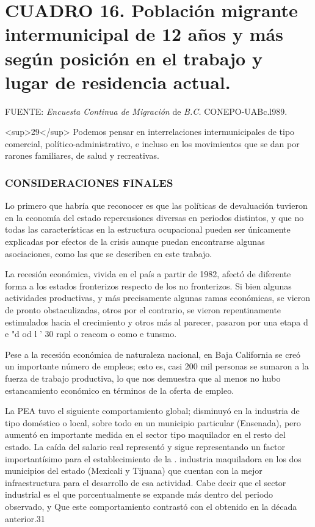 \documentclass{article}
\begin{document}
\section{CUADRO 16. Población migrante intermunicipal de 12 años y más según posición en el trabajo y lugar de residencia actual.}

FUENTE: \textit{Encuesta Continua de Migración} de \textit{B.C.} CONEPO-UABc.l989.

<sup>29</sup> Podemos pensar en interrelaciones intermunicipales de tipo comercial, político-administrativo, e incluso en los movimientos que se dan por rarones familiares, de salud y recreativas.

\subsubsection{\textbf{CONSIDERACIONES FINALES}}

Lo primero que habría que reconocer es que las políticas de devaluación tuvieron en la economía del estado repercusiones diversas en periodos distintos, y que no todas las características en la estructura ocupacional pueden ser únicamente explicadas por efectos de la crisis aunque puedan encontrarse algunas asociaciones, como las que se describen en este trabajo.

La recesión económica, vivida en el país a partir de 1982, afectó de diferente forma a los estados fronterizos respecto de los no fronterizos. Si bien algunas actividades productivas, y más precisamente algunas ramas económicas, se vieron de pronto obstaculizadas, otros por el contrario, se vieron repentinamente estimulados hacia el crecimiento y otros más al parecer, pasaron por una etapa d e "d od l ' 30 rapl o reacom o como e tunsmo.

Pese a la recesión económica de naturaleza nacional, en Baja California se creó un importante número de empleos; esto es, casi 200 mil personas se sumaron a la fuerza de trabajo productiva, lo que nos demuestra que al menos no hubo estancamiento económico en términos de la oferta de empleo.

La PEA tuvo el siguiente comportamiento global; disminuyó en la industria de tipo doméstico o local, sobre todo en un municipio particular (Ensenada), pero aumentó en importante medida en el sector tipo maquilador en el resto del estado. La caída del salario real representó y sigue representando un factor importantísimo para el establecimiento de la . industria maquiladora en los dos municipios del estado (Mexicali y Tijuana) que cuentan con la mejor infraestructura para el desarrollo de esa actividad. Cabe decir que el sector industrial es el que porcentualmente se expande más dentro del periodo observado, y Que este comportamiento contrastó con el obtenido en la década anterior.31
\end{document}
